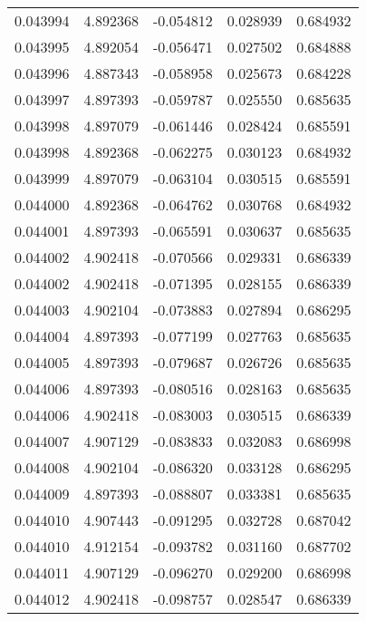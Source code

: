 \begin{tabular}{lrrrr}
0.043994    &  4.892368 & -0.054812 &  0.028939 &             0.684932 \\
0.043995    &  4.892054 & -0.056471 &  0.027502 &             0.684888 \\
0.043996    &  4.887343 & -0.058958 &  0.025673 &             0.684228 \\
0.043997    &  4.897393 & -0.059787 &  0.025550 &             0.685635 \\
0.043998    &  4.897079 & -0.061446 &  0.028424 &             0.685591 \\
0.043998    &  4.892368 & -0.062275 &  0.030123 &             0.684932 \\
0.043999    &  4.897079 & -0.063104 &  0.030515 &             0.685591 \\
0.044000    &  4.892368 & -0.064762 &  0.030768 &             0.684932 \\
0.044001    &  4.897393 & -0.065591 &  0.030637 &             0.685635 \\
0.044002    &  4.902418 & -0.070566 &  0.029331 &             0.686339 \\
0.044002    &  4.902418 & -0.071395 &  0.028155 &             0.686339 \\
0.044003    &  4.902104 & -0.073883 &  0.027894 &             0.686295 \\
0.044004    &  4.897393 & -0.077199 &  0.027763 &             0.685635 \\
0.044005    &  4.897393 & -0.079687 &  0.026726 &             0.685635 \\
0.044006    &  4.897393 & -0.080516 &  0.028163 &             0.685635 \\
0.044006    &  4.902418 & -0.083003 &  0.030515 &             0.686339 \\
0.044007    &  4.907129 & -0.083833 &  0.032083 &             0.686998 \\
0.044008    &  4.902104 & -0.086320 &  0.033128 &             0.686295 \\
0.044009    &  4.897393 & -0.088807 &  0.033381 &             0.685635 \\
0.044010    &  4.907443 & -0.091295 &  0.032728 &             0.687042 \\
0.044010    &  4.912154 & -0.093782 &  0.031160 &             0.687702 \\
0.044011    &  4.907129 & -0.096270 &  0.029200 &             0.686998 \\
0.044012    &  4.902418 & -0.098757 &  0.028547 &             0.686339 \\

\end{tabular}
